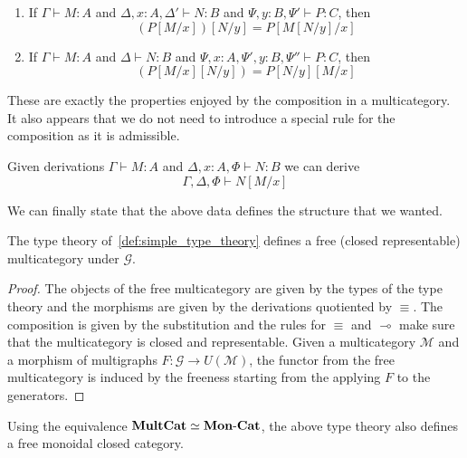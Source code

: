 \begin{proposition}\hspace{1em}
  \begin{enumerate}
  \item If $\Gamma \vdash M : A$ and $\Delta, x : A, \Delta' \vdash N : B$ and $\Psi, y : B, \Psi' \vdash P : C$, then
  \[
  (P[M/x])[N/y] = P[M[N/y]/x]
  \]
  \item If $\Gamma \vdash M : A$ and $\Delta \vdash N : B$ and $\Psi, x : A, \Psi', y : B, \Psi'' \vdash P : C$, then
  \[
  (P[M/x][N/y]) = P[N/y][M/x]
  \]
  \end{enumerate}
\end{proposition}

These are exactly the properties enjoyed by the composition in a multicategory.
It also appears that we do not need to introduce a special rule for the composition as it is admissible.

\begin{proposition}
  Given derivations $\Gamma \vdash M : A$ and $\Delta, x : A, \Phi \vdash N : B$ we can derive
  \[
  \Gamma, \Delta, \Phi \vdash N[M / x]
  \]
\end{proposition}

We can finally state that the above data defines the structure that we wanted.

\begin{proposition}
  The type theory of~\autoref{def:simple_type_theory} defines a free (closed representable) multicategory under $\mathcal{G}$.
\end{proposition}
\begin{proof}
  The objects of the free multicategory are given by the types of the type theory and the morphisms are given by the derivations quotiented by $\equiv$.
  The composition is given by the substitution and the rules for $\equiv$ and $\multimap$ make sure that the multicategory is closed and representable.
  Given a multicategory $\mathcal{M}$ and a morphism of multigraphs $F : \mathcal{G} \to U(\mathcal{M})$, the functor from the free multicategory is induced by the freeness starting from the applying $F$ to the generators.
\end{proof}

\begin{remark}
  Using the equivalence $\mathbf{MultCat} \simeq \mathbf{Mon}\text{-}\mathbf{Cat}$, the above type theory also defines a free monoidal closed category.
\end{remark}

